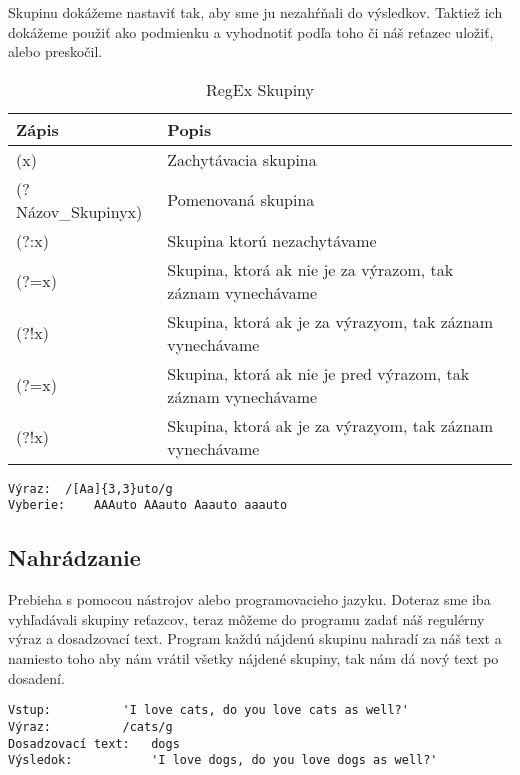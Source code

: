 \documentclass[10pt,twoside,slovak,a4paper]{article}
\begin{document}
Skupinu dokážeme nastaviť tak, aby sme ju nezahŕňali do výsledkov. Taktiež ich dokážeme použiť ako podmienku a vyhodnotiť podľa toho či náš reťazec uložiť, alebo preskočil.

\begin{table}
\centering
\caption{RegEx Skupiny}
\begin{tabular}{|l|l|} 
\hline
\textbf{Zápis}     & \textbf{Popis}                                                 \\ 
\hline
(x)                & Zachytávacia skupina                                           \\ 
\hline
(?Názov\_Skupinyx) & Pomenovaná skupina                                             \\ 
\hline
(?:x)              & Skupina ktorú nezachytávame                                    \\ 
\hline
(?=x)              & Skupina, ktorá ak nie je za výrazom, tak záznam vynechávame    \\ 
\hline
(?!x)              & Skupina, ktorá ak je za výrazyom, tak záznam vynechávame       \\ 
\hline
(?=x)              & Skupina, ktorá ak nie je pred výrazom, tak záznam vynechávame  \\ 
\hline
(?!x)              & Skupina, ktorá ak je za výrazyom, tak záznam vynechávame       \\
\hline
\end{tabular}
\end{table}
\begin{verbatim}
Výraz:	/[Aa]{3,3}uto/g
Vyberie:	AAAuto AAauto Aaauto aaauto
\end{verbatim}

\subsection{Nahrádzanie}
Prebieha s pomocou nástrojov alebo programovacieho jazyku. Doteraz sme iba vyhľadávali skupiny reťazcov, teraz môžeme do programu zadať náš regulérny výraz a dosadzovací text. Program každú nájdenú skupinu nahradí za náš text a namiesto toho aby nám vrátil všetky nájdené skupiny, tak nám dá nový text po dosadení.

\begin{verbatim}
Vstup:			'I love cats, do you love cats as well?'
Výraz:			/cats/g
Dosadzovací text: 	dogs
Výsledok:			'I love dogs, do you love dogs as well?'
\end{verbatim}
\end{document}
